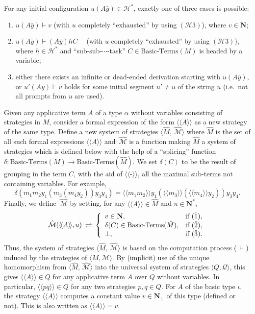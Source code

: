 \documentclass[fleqn]{LMCS}
\theoremstyle{plain}\newtheorem{satz}[thm]{Satz}
\theoremstyle{plain}\newtheorem{hyp}[thm]{Hypothesis}
\theoremstyle{plain}\newtheorem{hyps}[thm]{Hypotheses}
\theoremstyle{definition}\newtheorem{note}[thm]{Note}
\newcommand{\defis}{\mbox{-}}
\newcommand{\bYdef}{\mathrel{\BYDEF}}
\newcommand{\BYDEF}{\mbox{$\hspace{.2em}\rightleftharpoons\hspace{.2em}$}}
\newcommand{\arr}{\rightarrow}
\newcommand{\la}{\langle}
\newcommand{\ra}{\rangle}
\newcommand{\lla}{\langle\!\langle}
\newcommand{\rra}{\rangle\!\rangle}
\newcommand{\Osem}[1]{\lla #1 \rra}
\newcommand{\tuple}[1]{\la #1 \ra}
\newcommand{\NN}{\mathbf{N}}
\newcommand{\Undef}{{\perp}}
\newcommand{\MM}{{\mathcal M}}
\newcommand{\HH}{{\mathcal H}}
\newcommand{\QQ}{{\mathcal Q}}
\newcommand{\?}{\mbox{?}}
\begin{document}
For any initial configuration 
$u(A\bar{y})\in\HH^*$, 
exactly one 
of three cases is possible:
\begin{enumerate}
\item $u(A\bar{y})\vdash v$ (with $u$ completely ``exhausted'' by using $(\HH3)$), 
where $v\in \NN$; 
\item $u(A\bar{y})\vdash (A\bar{y})hC$ \ \ 
(with $u$ completely ``exhausted'' by using $(\HH3)$), where $h\in \HH^*$ and 
``sub-sub-$\cdots$-task'' $C\in\mbox{Basic-Terms}(M)$ is headed by a variable; 
\item either there exists an infinite or dead-ended derivation starting with 
$u(A\bar{y})$, or 
$u'(A\bar{y})\vdash v$ 
holds for some initial segment $u'\ne u$ of the string $u$ 
(i.e.\ not all prompts from $u$ are used). 
\end{enumerate}
Given any applicative term $A$ of a type $\alpha$ without variables 
consisting of strategies in $M$, 
consider a formal expression of the form $\Osem{A}$ as a new strategy 
of the same type. 
Define a new system of strategies $\tuple{\hat{M},\,\hat{\!\MM}}$ where 
$\hat{M}$ is the set of all such formal expressions  
$\Osem{A}$ and $\,\hat{\!\MM}$ is a function 
making $\hat{M}$ a system of strategies which is defined below 
with the help of a ``splicing'' function 
$\delta:\mbox{Basic-Terms}(M)\arr\mbox{Basic-Terms}(\hat{M})$. 
We set $\delta(C)$ to be the result of grouping in the term 
$C$, with the aid of $\Osem{\defis}$, all the maximal sub-terms 
not containing variables. For example, 
\[
\delta(m_1 m_2 y_1(m_3(m_4 y_2))y_3 y_4)=
\Osem{m_1 m_2} y_1(\Osem{m_3}(\Osem{m_4} y_2))y_3 y_4.
\]
Finally, we define $\,\hat{\!\MM}$ by setting, for any $\Osem{A}\in\hat{M}$ 
and $u\in\NN^*$, 
\[
\,\hat{\!\MM}(\Osem{A},u)\bYdef\left\{
\begin{array}{ll}
v\in\NN, & \mbox{if } (\hat{1}), \\
\delta(C)\in\mbox{Basic-Terms}(\hat{M}), & \mbox{if } (\hat{2}), \\
\bot, & \mbox{if } (\hat{3}). 
\end{array} \right.
\]
Thus, 
the system of strategies $\tuple{\hat{M},\,\hat{\!\MM}}$ 
is based on the computation process ($\,\vdash$) 
induced by the strategies of $\tuple{M,\MM}$. 
By (implicit) use of the unique homomorphism from $\tuple{\hat{M},\,\hat{\!\MM}}$ 
into the universal system of strategies $\tuple{Q,\QQ}$, this 
gives $\Osem{A}\in Q$ for any applicative term $A$ over $Q$ without variables. 
In particular, $\Osem{pq}\in Q$ for any two strategies $p,q\in Q$. 
For $A$ of the basic type $\iota$, the strategy 
$\Osem{A}$ computes a constant value $v\in\NN_\Undef$ 
of this type (defined or not). This is also written as $\Osem{A}=v$. 
\end{document}

